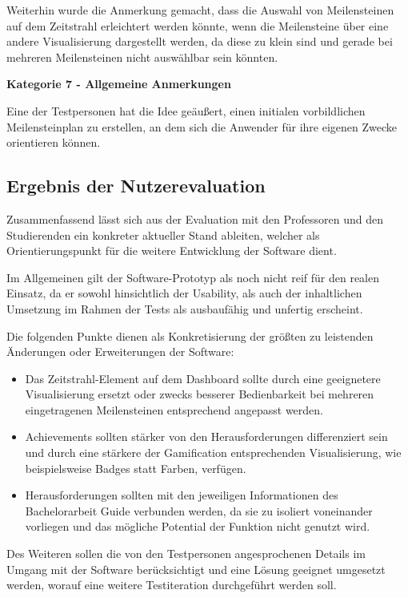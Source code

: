 \documentclass[bibliography=totoc,listof=totoc,BCOR=5mm,DIV=12,oneside]{scrbook}
\begin{document}
{\par Weiterhin wurde die Anmerkung gemacht, dass die Auswahl von Meilensteinen auf dem Zeitstrahl erleichtert werden könnte, wenn die Meilensteine über eine andere Visualisierung dargestellt werden, da diese zu klein sind und gerade bei mehreren Meilensteinen nicht auswählbar sein könnten.

\par \bigskip \textbf{Kategorie 7 - Allgemeine Anmerkungen}
\par Eine der Testpersonen hat die Idee geäußert, einen initialen vorbildlichen Meilensteinplan zu erstellen, an dem sich die Anwender für ihre eigenen Zwecke orientieren können.

\newpage
\subsection{Ergebnis der Nutzerevaluation}
\par Zusammenfassend lässt sich aus der Evaluation mit den Professoren und den Studierenden ein konkreter aktueller Stand ableiten, welcher als Orientierungspunkt für die weitere Entwicklung der Software dient.
\par \bigskip Im Allgemeinen gilt der Software-Prototyp als noch nicht reif für den realen Einsatz, da er sowohl hinsichtlich der Usability, als auch der inhaltlichen Umsetzung im Rahmen der Tests als ausbaufähig und unfertig erscheint.
\par \bigskip Die folgenden Punkte dienen als Konkretisierung der größten zu leistenden Änderungen oder Erweiterungen der Software:

\begin{itemize}
\item Das Zeitstrahl-Element auf dem Dashboard sollte durch eine geeignetere Visualisierung ersetzt oder zwecks besserer Bedienbarkeit bei mehreren eingetragenen Meilensteinen entsprechend angepasst werden.
\item Achievements sollten stärker von den Herausforderungen differenziert sein und durch eine stärkere der Gamification entsprechenden Visualisierung, wie beispielsweise Badges statt Farben, verfügen.
\item Herausforderungen sollten mit den jeweiligen Informationen des Bachelorarbeit Guide verbunden werden, da sie zu isoliert voneinander vorliegen und das mögliche Potential der Funktion nicht genutzt wird.
\end{itemize}

\par Des Weiteren sollen die von den Testpersonen angesprochenen Details im Umgang mit der Software berücksichtigt und eine Lösung geeignet umgesetzt werden, worauf eine weitere Testiteration durchgeführt werden soll.



}
\end{document}
